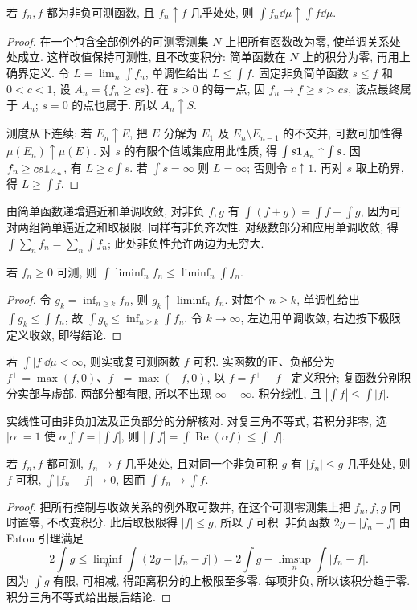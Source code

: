 \begin{theorem}[单调收敛]\label{thm:mct}
若 $f_n,f$ 都为非负可测函数, 且 $f_n\uparrow f$ 几乎处处, 则 $\int f_n\dd\mu\uparrow\int f\dd\mu$.
\end{theorem}
\begin{proof}
在一个包含全部例外的可测零测集 $N$ 上把所有函数改为零, 使单调关系处处成立. 这样改值保持可测性, 且不改变积分: 简单函数在 $N$ 上的积分为零, 再用上确界定义. 令 $L=\lim_n\int f_n$, 单调性给出 $L\le\int f$. 固定非负简单函数 $s\le f$ 和 $0<c<1$, 设 $A_n=\{f_n\ge cs\}$. 在 $s>0$ 的每一点, 因 $f_n\to f\ge s>cs$, 该点最终属于 $A_n$; $s=0$ 的点也属于. 所以 $A_n\uparrow S$.

测度从下连续: 若 $E_n\uparrow E$, 把 $E$ 分解为 $E_1$ 及 $E_n\setminus E_{n-1}$ 的不交并, 可数可加性得 $\mu(E_n)\uparrow\mu(E)$. 对 $s$ 的有限个值域集应用此性质, 得 $\int s\mathbf 1_{A_n}\uparrow\int s$. 因 $f_n\ge cs\mathbf 1_{A_n}$, 有 $L\ge c\int s$. 若 $\int s=\infty$ 则 $L=\infty$; 否则令 $c\uparrow1$. 再对 $s$ 取上确界, 得 $L\ge\int f$.
\end{proof}
由简单函数递增逼近和单调收敛, 对非负 $f,g$ 有 $\int(f+g)=\int f+\int g$, 因为可对两组简单逼近之和取极限. 同样有非负齐次性. 对级数部分和应用单调收敛, 得 $\int\sum_nf_n=\sum_n\int f_n$; 此处非负性允许两边为无穷大.

\begin{theorem}[Fatou 引理]\label{thm:fatou}
若 $f_n\ge0$ 可测, 则 $\int\liminf_nf_n\le\liminf_n\int f_n$.
\end{theorem}
\begin{proof}
令 $g_k=\inf_{n\ge k}f_n$, 则 $g_k\uparrow\liminf_nf_n$. 对每个 $n\ge k$, 单调性给出 $\int g_k\le\int f_n$, 故 $\int g_k\le\inf_{n\ge k}\int f_n$. 令 $k\to\infty$, 左边用单调收敛, 右边按下极限定义收敛, 即得结论.
\end{proof}

\begin{definition}
若 $\int|f|\dd\mu<\infty$, 则实或复可测函数 $f$ 可积. 实函数的正、负部分为 $f^+=\max(f,0)$、$f^-=\max(-f,0)$, 以 $f=f^+-f^-$ 定义积分; 复函数分别积分实部与虚部. 两部分都有限, 所以不出现 $\infty-\infty$. 积分线性, 且 $|\int f|\le\int|f|$.
\end{definition}
实线性可由非负加法及正负部分的分解核对. 对复三角不等式, 若积分非零, 选 $|\alpha|=1$ 使 $\alpha\int f=|\int f|$, 则 $|\int f|=\int\operatorname{Re}(\alpha f)\le\int|f|$.

\begin{theorem}[控制收敛]\label{thm:dct}
若 $f_n,f$ 都可测, $f_n\to f$ 几乎处处, 且对同一个非负可积 $g$ 有 $|f_n|\le g$ 几乎处处, 则 $f$ 可积, $\int|f_n-f|\to0$, 因而 $\int f_n\to\int f$.
\end{theorem}
\begin{proof}
把所有控制与收敛关系的例外取可数并, 在这个可测零测集上把 $f_n,f,g$ 同时置零, 不改变积分. 此后取极限得 $|f|\le g$, 所以 $f$ 可积. 非负函数 $2g-|f_n-f|$ 由 Fatou 引理满足
\[
2\int g\le\liminf_n\int(2g-|f_n-f|)
=2\int g-\limsup_n\int|f_n-f|.
\]
因为 $\int g$ 有限, 可相减, 得距离积分的上极限至多零. 每项非负, 所以该积分趋于零. 积分三角不等式给出最后结论.
\end{proof}


